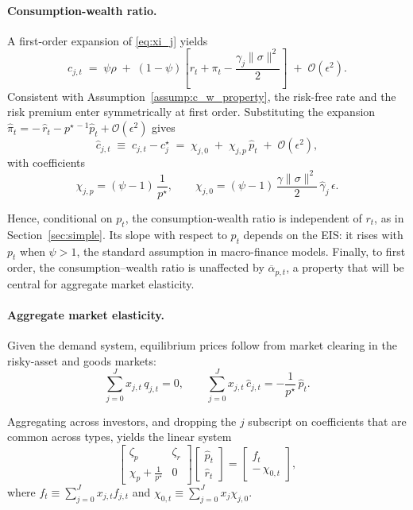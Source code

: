 \documentclass[12pt,english]{article}
\begin{document}
\paragraph{Consumption-wealth ratio.}  
A first-order expansion of \eqref{eq:xi_j} yields
\begin{equation}
    c_{j,t}
    \;=\;
    \psi\rho \;+\; (1-\psi)\!\left[r_t + \pi_t - \frac{\gamma_j\|\sigma\|^2}{2}\right]
    \;+\; \mathcal{O}(\epsilon^2).
\end{equation}
Consistent with Assumption~\ref{assump:c_w_property}, the risk-free rate and the risk premium enter symmetrically at first order. Substituting the expansion
\(\hat{\pi}_t = -\,\hat{r}_t - p^{\star\,-1}\hat{p}_t + \mathcal{O}(\epsilon^2)\) gives
\begin{equation}
    \hat c_{j,t} \;\equiv\; c_{j,t} - c_j^\star
    \;=\; \chi_{j,0} \;+\; \chi_{j,p}\,\hat{p}_t \;+\; \mathcal{O}(\epsilon^2),
\end{equation}
with coefficients
\[
    \chi_{j,p}=(\psi-1)\,\frac{1}{p^\star},
    \qquad 
    \chi_{j,0}=(\psi-1)\,\frac{\gamma\|\sigma\|^2}{2}\,\hat{\gamma}_j\,\epsilon.
\]

Hence, conditional on $p_t$, the consumption-wealth ratio is independent of $r_t$, as in Section~\ref{sec:simple}. Its slope with respect to $p_t$ depends on the EIS: it rises with $p_t$ when $\psi>1$, the standard assumption in macro-finance models. Finally, to first order, the consumption–wealth ratio is unaffected by $\overline{\alpha}_{p,t}$, a property that will be central for aggregate market elasticity.


\paragraph{Aggregate market elasticity.}  
Given the demand system, equilibrium prices follow from market clearing in the risky-asset and goods markets:
\[
    \sum_{j=0}^J x_{j,t}\, q_{j,t} = 0,
    \qquad
    \sum_{j=0}^J x_{j,t}\, \hat{c}_{j,t} = -\frac{1}{p^\star}\,\hat{p}_t .
\]

Aggregating across investors, and dropping the $j$ subscript on coefficients that are common across types, yields the linear system
\[
    \begin{bmatrix}
        \zeta_p & \zeta_r \\
        \chi_p + \tfrac{1}{p^\star} & 0
    \end{bmatrix}
    \begin{bmatrix}
        \hat{p}_t \\[4pt]
        \hat{r}_t
    \end{bmatrix}
    =
    \begin{bmatrix}
        f_t \\[4pt]
        -\,\chi_{0,t}
    \end{bmatrix},
\]
where $f_t \equiv \sum_{j=0}^J x_{j,t} f_{j,t}$ and $\chi_{0,t} \equiv \sum_{j=0}^J x_j \chi_{j,0}$.
\end{document}
